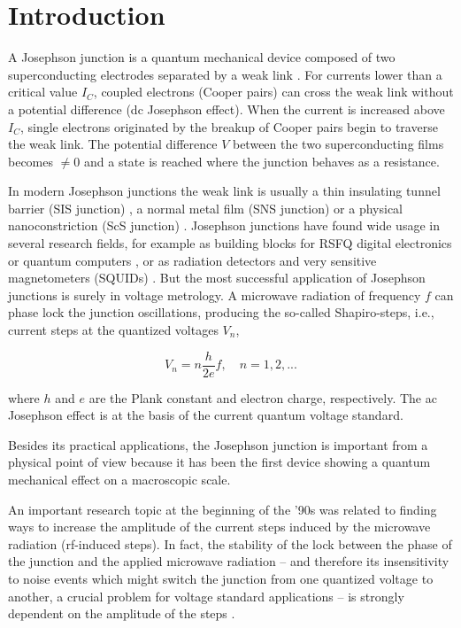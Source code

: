 \section{Introduction}


A Josephson junction is a quantum mechanical device composed of two superconducting electrodes separated by a weak link \cite{Barone:1982}.
For currents lower than a critical value $I_C$, coupled electrons (Cooper pairs) can cross the weak link without a potential difference (dc Josephson effect).
When the current is increased above $I_C$, single electrons originated by the breakup of Cooper pairs begin to traverse the weak link. The potential difference $V$ between the two superconducting films becomes $\neq 0$ and a state is reached where the junction behaves as a resistance.

In modern Josephson junctions the weak link is usually a thin insulating tunnel barrier (SIS junction) \cite{Gurvitch:1983}, a normal metal film (SNS junction) \cite{Benz:1995} or a physical nanoconstriction (ScS junction) \cite{Cybart:2015, DeLeo:2016}. Josephson junctions have found wide usage in several research fields, for example as building blocks for RSFQ digital electronics  or quantum computers \cite{Likharev:1991}, or as radiation detectors and very sensitive magnetometers (SQUIDs) \cite{Maggi:2006b, Troeman:2007, Granata:2015}.
But the most successful application of Josephson junctions is surely in voltage metrology.
A microwave radiation of frequency $f$ can phase lock the junction oscillations, producing the so-called Shapiro-steps, i.e., current steps at the quantized voltages $V_n$, 

\begin{equation}
	V_n = n \frac{h}{2 e} f, \quad n = 1, 2, ...
\end{equation}

where $h$ and $e$ are the Plank constant and electron charge, respectively. The ac Josephson effect is at the basis of the current quantum voltage standard.

Besides its practical applications, the Josephson junction is important from a physical point of view because it has been the first device showing a quantum mechanical effect on a macroscopic scale.

An important research topic at the beginning of the '90s was related to finding ways to increase the amplitude of the current steps induced by the microwave radiation (rf-induced steps). In fact, the stability of the lock between the phase of the junction and the applied microwave radiation -- and therefore its insensitivity to noise events which might switch the junction from one quantized voltage to another, a crucial problem for voltage standard applications -- is strongly dependent on the amplitude of the steps \cite{Kautz:1987}.

